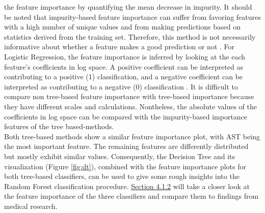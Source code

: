 the feature importance by quantifying the mean decrease in impurity. 
It should be noted that impurity-based feature importance can suffer 
from favoring features with a high number of unique values and from making 
predictions based on statistics derived from the training set. Therefore, this 
method is not necessarily informative about whether a feature makes a 
good prediction or not \cite{RN178}.
For Logistic Regression, the feature importance is inferred by looking at the 
each feature's coefficients in log space. A positive coefficient can be 
interpreted as contributing to a positive (1) classification, and a negative 
coefficient can be interpreted as contributing to a negative (0) classification 
\cite{RN174}.
It is difficult to compare non tree-based feature importance with tree-based 
importance because they have different scales and calculations. Nontheless, the 
absolute values of the coefficients in log space can be compared with the 
impurity-based importance features of the tree based-methods.
\\
Both tree-based methods show a similar feature importance plot, with AST being 
the most important feature. The remaining features are differently distributed 
but mostly exhibit similar values. Consequently, the Decision Tree and its 
visualization (Figure \ref{fig:dt}), combined with the feature 
importance plots for both tree-based classifiers, can be used to give some 
rough insights into the Random Forest classification procedure. 
\hyperref[sec:medical]{Section 4.1.2} will take a closer look at the feature 
importance of the three classifiers and compare them to findings from medical 
research.

